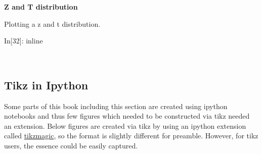 \documentclass[float=false,crop=false]{standalone}
\begin{document}
    \textbf{Z and T distribution}

Plotting a z and t distribution.
\begin{InVerbatim}[commandchars=\\\{\},fontsize=\scriptsize]
{\color{incolor}In[{\color{incolor}32}]:}  inline
             
            
            
         
           
           
           
            
             
             
\end{InVerbatim}
    \begin{center}
    \end{center}
    { \hspace*{\fill} \\}
    
    \subsection{Tikz in Ipython}\label{tikz-in-ipython}

Some parts of this book including this section are created using ipython
notebooks and thus few figures which needed to be constructed via tikz
needed an extension. Below figures are created via tikz by using an
ipython extension called
\href{https://github.com/mkrphys/ipython-tikzmagic}{tikzmagic}, so the
format is slightly different for preamble. However, for tikz users, the
essence could be easily captured.
\end{document}
